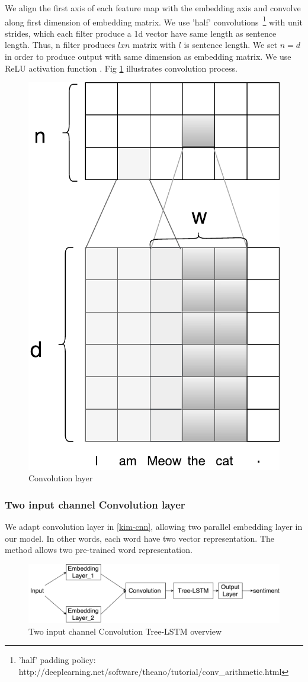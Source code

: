 We align the first axis of each feature map with the embedding axis and convolve along first dimension of embedding matrix. 
We use 'half' convolutions~\footnote{'half' padding policy: http://deeplearning.net/software/theano/tutorial/conv\_arithmetic.html} with unit strides, which each filter produce a 1d vector have same length as sentence length. 
Thus, n filter produces $l x n$ matrix with $l$ is sentence length. We set $n = d$ in order to produce output with same dimension as embedding matrix. We use ReLU activation function \cite{hahnloser2000digital}. Fig \ref{fig:convlayer} illustrates convolution process. 



\begin{figure}[H]
	\centering
	\includegraphics[width=0.6\linewidth]{figure/convlayer}
	\caption[Convolution layer]{Convolution layer}
	\label{fig:convlayer}
\end{figure}

\subsubsection{Two input channel Convolution layer}
We adapt convolution layer in \ref{kim-cnn}, allowing two parallel embedding layer in our model. In other words, each word have two vector representation. The method allows two pre-trained word representation. 

\begin{figure}[H]
	\centering
	\includegraphics[width=0.8\linewidth]{figure/multichannelcnnlstm}
	\caption[Convolution Tree-LSTM overview]{Two input channel Convolution Tree-LSTM overview}
	\label{fig:multichannelcnnlstm}
\end{figure}

